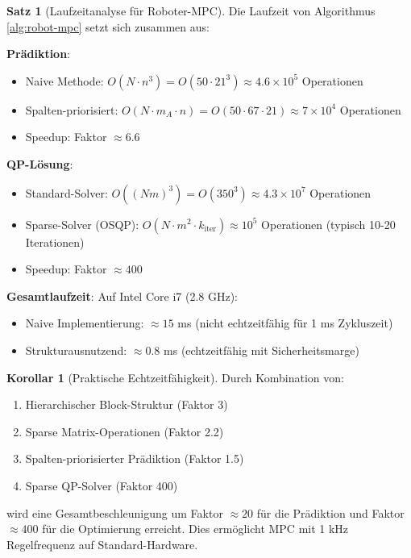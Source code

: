 \documentclass[a4paper,12pt]{report}
\theoremstyle{definition}
\newtheorem{satz}{Satz}
\newtheorem{korollar}{Korollar}
\begin{document}
	\begin{satz}[Laufzeitanalyse für Roboter-MPC]
		Die Laufzeit von Algorithmus \ref{alg:robot-mpc} setzt sich zusammen aus:
		
		\textbf{Prädiktion}:
		\begin{itemize}
			\item Naive Methode: $O(N \cdot n^3) = O(50 \cdot 21^3) \approx 4.6 \times 10^5$ Operationen
			\item Spalten-priorisiert: $O(N \cdot m_A \cdot n) = O(50 \cdot 67 \cdot 21) \approx 7 \times 10^4$ Operationen
			\item Speedup: Faktor $\approx 6.6$
		\end{itemize}
		
		\textbf{QP-Lösung}:
		\begin{itemize}
			\item Standard-Solver: $O((Nm)^3) = O(350^3) \approx 4.3 \times 10^7$ Operationen
			\item Sparse-Solver (OSQP): $O(N \cdot m^2 \cdot k_{\text{iter}}) \approx 10^5$ Operationen (typisch 10-20 Iterationen)
			\item Speedup: Faktor $\approx 400$
		\end{itemize}
		
		\textbf{Gesamtlaufzeit}:
		Auf Intel Core i7 (2.8 GHz):
		\begin{itemize}
			\item Naive Implementierung: $\approx 15$ ms (nicht echtzeitfähig für 1 ms Zykluszeit)
			\item Strukturausnutzend: $\approx 0.8$ ms (echtzeitfähig mit Sicherheitsmarge)
		\end{itemize}
	\end{satz}
	
	\begin{korollar}[Praktische Echtzeitfähigkeit]
		Durch Kombination von:
		\begin{enumerate}
			\item Hierarchischer Block-Struktur (Faktor 3)
			\item Sparse Matrix-Operationen (Faktor 2.2)
			\item Spalten-priorisierter Prädiktion (Faktor 1.5)
			\item Sparse QP-Solver (Faktor 400)
		\end{enumerate}
		
		wird eine Gesamtbeschleunigung um Faktor $\approx 20$ für die Prädiktion und Faktor $\approx 400$ für die Optimierung erreicht. Dies ermöglicht MPC mit 1 kHz Regelfrequenz auf Standard-Hardware.
	\end{korollar}
	
\end{document}
